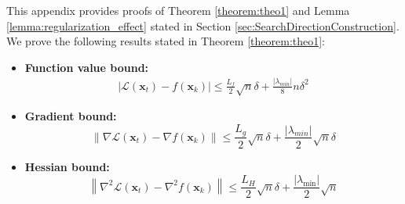 \documentclass{elsarticle}
\newtheorem{definition}{Definition}
\numberwithin{equation}{section}
\begin{document}
This appendix provides proofs of Theorem \ref{theorem:theo1} and Lemma \ref{lemma:regularization_effect} stated in Section  \ref{sec:SearchDirectionConstruction}. 
We prove the following results stated in Theorem \ref{theorem:theo1}:

\begin{itemize}
    \item \textbf{Function value bound:}
       \begin{align*}
    \left| \mathcal{L}(\mathbf{x}_t) - f(\mathbf{x}_k) \right| \leq \frac{L_f}{2} \sqrt{n} \delta + \frac{|\lambda_{min}|}{8} n \delta^2
\end{align*}
    
    \item \textbf{Gradient bound:}
    \[
    \left\| \nabla \mathcal{L}(\mathbf{x}_t) - \nabla f(\mathbf{x}_k) \right\| \leq \frac{L_g}{2} \sqrt{n} \delta + \frac{|\lambda_{min}|}{2} \sqrt{n}\delta
    \]
    
    \item \textbf{Hessian bound:}
    \[
    \left\| \nabla^2 \mathcal{L}(\mathbf{x}_t) - \nabla^2 f(\mathbf{x}_k) \right\| \leq \frac{L_H}{2} \sqrt{n} \delta + \frac{|\lambda_{\min}|}{2} \sqrt{n} 
    \]
\end{itemize}
\end{document}
